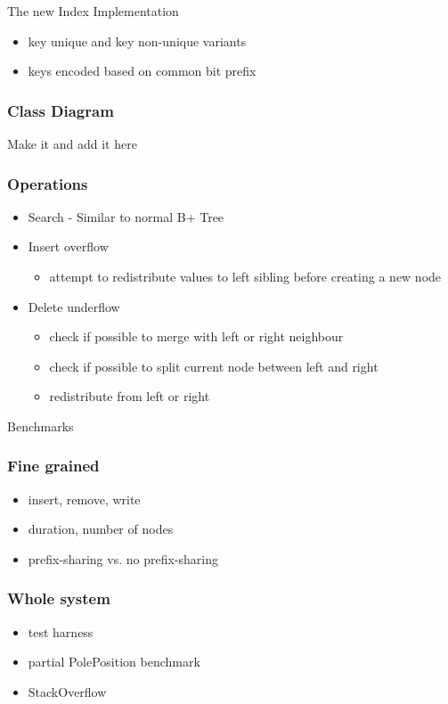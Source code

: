 \documentclass{beamer}
\begin{document}
\begin{section}{The new Index Implementation}
\begin{frame}
\begin{itemize}
        \item key unique and key non-unique variants
        \item keys encoded based on common bit prefix
      \end{itemize}
    \end{frame}
    \begin{frame}
        \frametitle{Class Diagram}
        Make it and add it here    
    \end{frame}
    \begin{frame}
        \frametitle{Operations}
        \begin{itemize}
        \item Search - Similar to normal B+ Tree
        \item Insert overflow
            \begin{itemize}
            \item attempt to redistribute values to left sibling before creating a new node
            \end{itemize}
        \item Delete underflow
            \begin{itemize}
            \item check if possible to merge with left or right neighbour
            \item check if possible to split current node between left and right
            \item redistribute from left or right
            \end{itemize}
        \end{itemize}
    \end{frame}
  \end{section}

  \begin{section}{Benchmarks}
    \begin{frame}
      \frametitle{Fine grained}
        \begin{itemize}
          \item insert, remove, write
          \item duration, number of nodes
          \item prefix-sharing vs. no prefix-sharing
        \end{itemize}
    \end{frame}
    \begin{frame}
      \frametitle{Whole system}
        \begin{itemize}
          \item test harness
          \item partial PolePosition benchmark
          \item StackOverflow
        \end{itemize}
    \end{frame}
  \end{section}
\end{document}
